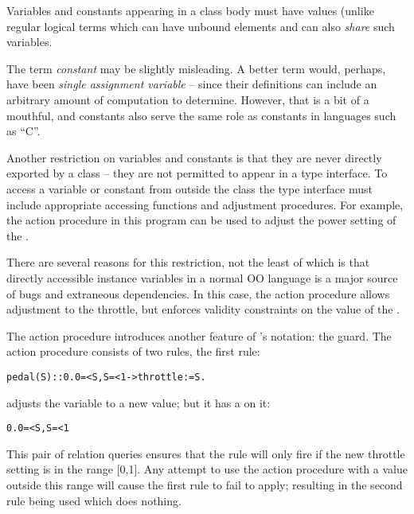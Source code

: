 Variables and constants appearing in a class body must have  values (unlike regular logical terms which can have unbound elements and can also \emph{share} such variables.

\begin{aside}
The term \emph{constant} may be slightly misleading. A better term would, perhaps, have been \emph{single assignment variable} -- since their definitions can include an arbitrary amount of computation to determine. However, that is a bit of a mouthful, and constants also serve the same role as constants in languages such as ``C''.
\end{aside}

\noindent
Another restriction on variables and constants is that they are never directly exported by a class -- they are not permitted to appear in a type interface. To access a variable or constant from outside the class the type interface must include appropriate accessing functions and adjustment procedures. For example, the  action procedure in this program can be used to adjust the power setting of the .

There are several reasons for this restriction, not the least of which is that directly accessible instance variables in a normal OO language is a major source of bugs and extraneous dependencies. In this case, the  action procedure allows adjustment to the throttle, but enforces validity constraints on the value of the .

The  action procedure introduces another feature of \go's notation: the guard. The  action procedure consists of two rules, the first rule:
\begin{alltt}
pedal(S)::0.0=<S,S=<1 -> throttle:=S.
\end{alltt}
adjusts the  variable to a new value; but it has a  on it:
\begin{alltt}
0.0=<S,S=<1
\end{alltt}
This pair of relation queries ensures that the rule will only fire if the new throttle setting is in the range [0,1]. Any attempt to use the  action procedure with a value outside this range will cause the first rule to fail to apply; resulting in the second rule being used which does nothing.

